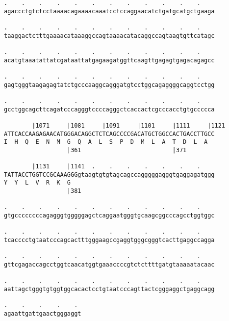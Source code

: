 \documentclass{article}
\begin{document}
\begin{Verbatim}
.    .    .    .    .    .    .    .    .    .    .    .    
agaccctgtctcctaaaacagaaaacaaatcctccaggaacatctgatgcatgctgaaga
                                                            
.    .    .    .    .    .    .    .    .    .    .    .    
taaggactctttgaaaacataaaggccagtaaaacatacaggccagtaagtgttcatagc
                                                            
.    .    .    .    .    .    .    .    .    .    .    .    
acatgtaaatattatcgataattatgagaagatggttcaagttgagagtgagacagagcc
                                                            
.    .    .    .    .    .    .    .    .    .    .    .    
gagtgggtaagagagtatctgcccaaggcagggatgtcctggcagaggggcaggtcctgg
                                                            
.    .    .    .    .    .    .    .    .    .    .    .    
gcctggcagcttcagatcccagggtccccagggctcaccactcgcccacctgtgccccca
                                                            
        |1071     |1081     |1091     |1101     |1111     |1121
ATTCACCAAGAGAACATGGGACAGGCTCTCAGCCCCGACATGCTGGCCACTGACCTTGCC
I  H  Q  E  N  M  G  Q  A  L  S  P  D  M  L  A  T  D  L  A  
                  |361                          |371        
  
        |1131     |1141  .    .    .    .    .    .    .    
TATTACCTGGTCCGCAAAGGGgtaagtgtgtagcagccagggggagggtgaggagatggg
Y  Y  L  V  R  K  G                                         
                  |381                                      
  
.    .    .    .    .    .    .    .    .    .    .    .    
gtgccccccccagagggtgggggagctcaggaatgggtgcaagcggcccagcctggtggc
                                                            
.    .    .    .    .    .    .    .    .    .    .    .    
tcacccctgtaatcccagcactttgggaagccgaggtgggcgggtcacttgaggccagga
                                                            
.    .    .    .    .    .    .    .    .    .    .    .    
gttcgagaccagcctggtcaacatggtgaaaccccgtctcttttgatgtaaaaatacaac
                                                            
.    .    .    .    .    .    .    .    .    .    .    .    
aattagctgggtgtggtggcacactcctgtaatcccagttactcgggaggctgaggcagg
                                                            
.    .    .    .    . 
agaattgattgaactgggaggt
                      

\end{Verbatim}
\end{document}
